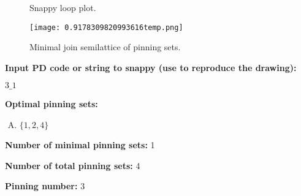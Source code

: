\documentclass{article}%
\begin{document}
\begin{multicols}{2}
\begin{figure}[H]
\centering

\caption{Snappy loop plot.}
\label{fig:0.07459543332294027temp.svg}
\end{figure}\columnbreak

\begin{figure}[H]
\centering
\texttt{[image: 0.9178309820993616temp.png]}
\caption{Minimal join semilattice of pinning sets.}
\label{fig:0.9178309820993616temp.png}
\end{figure}\end{multicols}\newpage\begin{multicols}{2}

\columnbreak

\noindent\textbf{Input PD code or string to snappy (use to reproduce the drawing):}

	$3\_1$

\noindent\textbf{Optimal pinning sets:}

\begin{enumerate}[A)]
\item{\Huge\textcolor{red0}{\textbullet}}$\{1,2,4\}$

\end{enumerate}


\noindent\textbf{Number of minimal pinning sets:} 1

\noindent\textbf{Number of total pinning sets:} 4

\noindent\textbf{Pinning number:} 3


\end{multicols}
\end{document}
